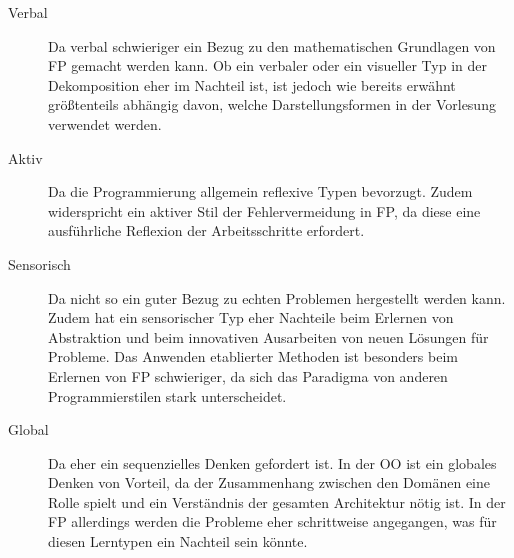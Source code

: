 \begin{description}
    \item[Verbal] Da verbal schwieriger ein Bezug zu den mathematischen Grundlagen von FP gemacht werden kann. Ob ein verbaler oder ein visueller Typ in der Dekomposition eher im Nachteil ist, ist jedoch wie bereits erwähnt größtenteils abhängig davon, welche Darstellungsformen in der Vorlesung verwendet werden.
    \item[Aktiv] Da die Programmierung allgemein reflexive Typen bevorzugt. Zudem widerspricht ein aktiver Stil der Fehlervermeidung in FP, da diese eine ausführliche Reflexion der Arbeitsschritte erfordert.
    \item[Sensorisch] Da nicht so ein guter Bezug zu echten Problemen hergestellt werden kann. Zudem hat ein sensorischer Typ eher Nachteile beim Erlernen von Abstraktion und beim innovativen Ausarbeiten von neuen Lösungen für Probleme. Das Anwenden etablierter Methoden ist besonders beim Erlernen von FP schwieriger, da sich das Paradigma von anderen Programmierstilen stark unterscheidet.
    \item[Global] Da eher ein sequenzielles Denken gefordert ist. In der OO ist ein globales Denken von Vorteil, da der Zusammenhang zwischen den Domänen eine Rolle spielt und ein Verständnis der gesamten Architektur nötig ist. In der FP allerdings werden die Probleme eher schrittweise angegangen, was für diesen Lerntypen ein Nachteil sein könnte.
\end{description}